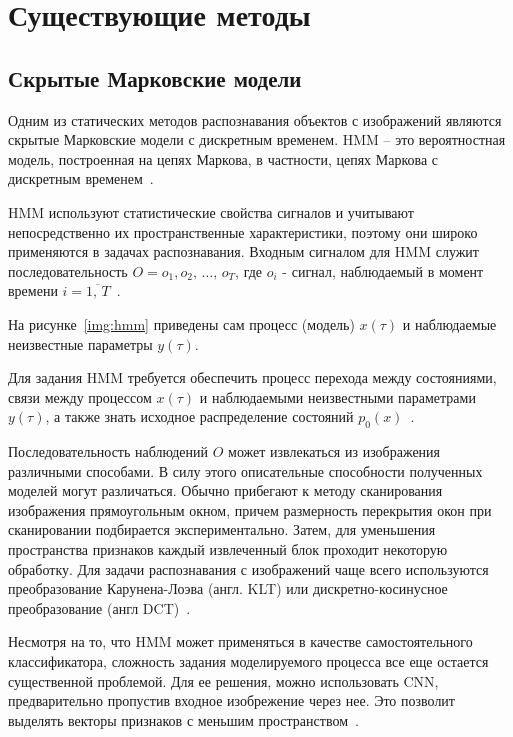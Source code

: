 \chapter{Существующие методы}

\section{Скрытые Марковские модели}

Одним из статических методов распознавания объектов с изображений являются скрытые Марковские модели с дискретным временем. HMM -- это вероятностная модель, построенная на цепях Маркова, в частности, цепях Маркова с дискретным временем~\cite{hmm-early-classification}.

HMM используют статистические свойства сигналов и учитывают непосредственно их пространственные характеристики, поэтому они широко применяются в задачах распознавания. Входным сигналом для HMM служит последовательность $O = o_1,o_2,\,\dots,\,o_T$, где $o_i$ - сигнал, наблюдаемый в момент времени $i=\overline{1,\,T}$~\cite{hmm-early-classification}.

На рисунке~\ref{img:hmm} приведены сам процесс (модель) $x(\tau)$ и наблюдаемые неизвестные параметры $y(\tau)$.


Для задания HMM требуется обеспечить процесс перехода между состояниями, связи между процессом $x(\tau)$ и наблюдаемыми неизвестными параметрами $y(\tau)$, а также знать исходное распределение состояний $p_0(x)$~\cite{hmm-ship-behavior-prediction}.

Последовательность наблюдений $O$ может извлекаться из изображения различными способами. В силу этого описательные способности полученных моделей могут различаться. Обычно прибегают к методу сканирования изображения прямоугольным окном, причем размерность перекрытия окон при сканировании подбирается экспериментально. Затем, для уменьшения пространства признаков каждый извлеченный блок проходит некоторую обработку. Для задачи распознавания с изображений чаще всего используются преобразование Карунена-Лоэва (англ. KLT) или дискретно-косинусное преобразование (англ DCT)~\cite{hmm-intro}.

Несмотря на то, что HMM может применяться в качестве самостоятельного классификатора,
сложность задания моделируемого процесса все еще остается существенной проблемой. Для ее решения, можно использовать CNN, предварительно пропустив входное изобрежение через нее. Это позволит выделять векторы признаков с меньшим пространством~\cite{hmm-and-cnn}.

